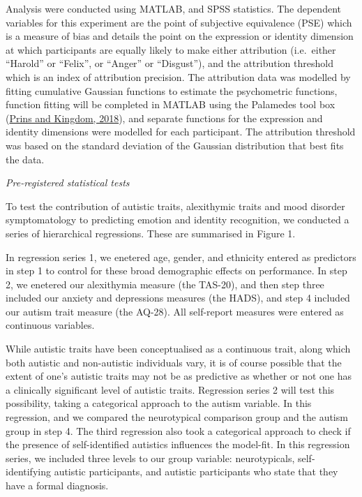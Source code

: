 \documentclass[
]{article}
\begin{document}
Analysis were conducted using MATLAB, and SPSS statistics. The dependent variables for this experiment are the point of subjective equivalence (PSE) which is a measure of bias and details the point on the expression or identity dimension at which participants are equally likely to make either attribution (i.e.~either ``Harold'' or ``Felix'', or ``Anger'' or ``Disgust''), and the attribution threshold which is an index of attribution precision. The attribution data was modelled by fitting cumulative Gaussian functions to estimate the psychometric functions, function fitting will be completed in MATLAB using the Palamedes tool box (\protect\hyperlink{ref-prins2018a}{Prins and Kingdom, 2018}), and separate functions for the expression and identity dimensions were modelled for each participant. The attribution threshold was based on the standard deviation of the Gaussian distribution that best fits the data.

\emph{Pre-registered statistical tests}

To test the contribution of autistic traits, alexithymic traits and mood disorder symptomatology to predicting emotion and identity recognition, we conducted a series of hierarchical regressions. These are summarised in Figure 1.

In regression series 1, we enetered age, gender, and ethnicity entered as predictors in step 1 to control for these broad demographic effects on performance. In step 2, we enetered our alexithymia measure (the TAS-20), and then step three included our anxiety and depressions measures (the HADS), and step 4 included our autism trait measure (the AQ-28). All self-report measures were entered as continuous variables.

While autistic traits have been conceptualised as a continuous trait, along which both autistic and non-autistic individuals vary, it is of course possible that the extent of one's autistic traits may not be as predictive as whether or not one has a clinically significant level of autistic traits. Regression series 2 will test this possibility, taking a categorical approach to the autism variable. In this regression, and we compared the neurotypical comparison group and the autism group in step 4.
The third regression also took a categorical approach to check if the presence of self-identified autistics influences the model-fit. In this regression series, we included three levels to our group variable: neurotypicals, self-identifying autistic participants, and autistic participants who state that they have a formal diagnosis.
\end{document}
